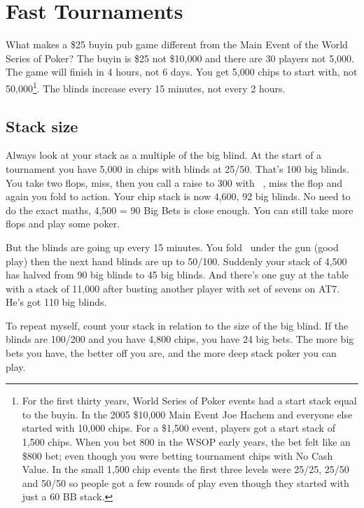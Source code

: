 \chapter{Fast Tournaments}


What makes a \$25 buyin pub game different from the Main Event of
the World Series of Poker? The buyin is \$25 not \$10,000 and there are 30
players not 5,000. The game will finish in 4 hours, not 6 days. You get
5,000 chips to start with, not 50,000\footnote{For the first thirty
years, World Series of Poker events had a start stack equal to the
buyin. In the 2005 \$10,000 Main Event Joe Hachem and everyone else
started with 10,000 chips. For a \$1,500 event, players got a start
stack of 1,500 chips. When you bet 800 in the WSOP early years, the bet
felt like an \$800 bet; even though you were betting tournament chips
with No Cash Value. In the small 1,500 chip events the first three
levels were 25/25, 25/50 and 50/50 so people got a few rounds of play
even though they started with just a 60 BB stack.}. The blinds
increase every 15 minutes, not every 2 hours.

\section{Stack size}

Always look at your stack as a multiple of the big blind.
At the start of a tournament you have 5,000 in chips with blinds
at 25/50. That's 100 big blinds. You take two flops, miss, then you
call a raise to 300 with \sixs\sixc\ , miss the flop and again you
fold to action. Your chip stack is now 4,600, 92 big blinds. No need
to do the exact maths, 4,500 = 90 Big Bets is close enough. You can
still take more flops and play some poker.

But the blinds are going up every 15 minutes. You fold \Ah\eigc\ under
the gun (good play) then the next hand blinds are up to 50/100.
Suddenly your stack of 4,500 has halved from 90 big blinds to 45
big blinds. And there's one guy at the table with a stack of 11,000 after
busting another player with set of sevens on AT7. He's got 110 big
blinds.

To repeat myself, count your stack in relation to the size of
the big blind. If the blinds are 100/200 and you have 4,800 chips, you
have 24 big bets. The more big bets you have, the better off you are,
and the more deep stack poker you can play.

